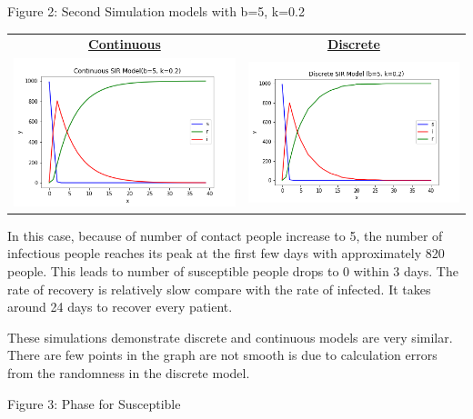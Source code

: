 \documentclass[11pt,a4paper]{article}
\begin{document}

  \begin{center}
 	Figure 2: Second Simulation models with b=5, k=0.2
 \end{center}

 \begin{center}
 	
 	\begin{tabular}{c c}
 		\textbf{\underline{Continuous}} &
 		\textbf{\underline{Discrete}} \\
 		\includegraphics[width=.5\textwidth]{C_SIR_2.png} & \includegraphics[width=.5\textwidth]{D_SIR_1.png}
 	\end{tabular}
 
 \end{center}

\medskip \noindent
In this case, because of number of contact people increase to 5, the number of infectious people reaches its peak at the first few days with approximately 820 people. This leads to number of susceptible people drops to 0 within 3 days. The rate of recovery is relatively slow compare with the rate of infected. It takes around 24 days to recover every patient. 

\medskip \noindent
These simulations demonstrate discrete and continuous models are very similar. There are few points in the graph are not smooth is due to calculation errors from the randomness in the discrete model.

\newpage
  \begin{center}
 	Figure 3: Phase for Susceptible
 \end{center}
\end{document}
